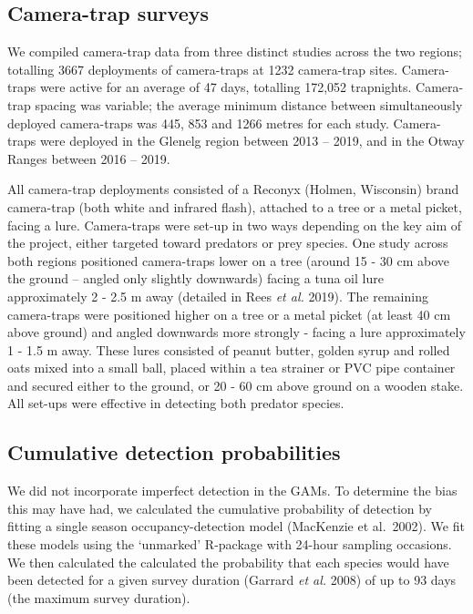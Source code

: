 \documentclass[11pt,a4paper,titlepage,twoside,openright]{style/unimelbthesis}
\begin{document}
\begin{mainmatter}
\hypertarget{camera-trap-surveys}{%
\subsection{Camera-trap surveys}\label{camera-trap-surveys}}

We compiled camera-trap data from three distinct studies across the two regions; totalling 3667 deployments of camera-traps at 1232 camera-trap sites. Camera-traps were active for an average of 47 days, totalling 172,052 trapnights. Camera-trap spacing was variable; the average minimum distance between simultaneously deployed camera-traps was 445, 853 and 1266 metres for each study. Camera-traps were deployed in the Glenelg region between 2013 -- 2019, and in the Otway Ranges between 2016 -- 2019.

All camera-trap deployments consisted of a Reconyx (Holmen, Wisconsin) brand camera-trap (both white and infrared flash), attached to a tree or a metal picket, facing a lure. Camera-traps were set-up in two ways depending on the key aim of the project, either targeted toward predators or prey species. One study across both regions positioned camera-traps lower on a tree (around 15 - 30 cm above the ground -- angled only slightly downwards) facing a tuna oil lure approximately 2 - 2.5 m away (detailed in Rees \emph{et al.} 2019). The remaining camera-traps were positioned higher on a tree or a metal picket (at least 40 cm above ground) and angled downwards more strongly - facing a lure approximately 1 - 1.5 m away. These lures consisted of peanut butter, golden syrup and rolled oats mixed into a small ball, placed within a tea strainer or PVC pipe container and secured either to the ground, or 20 - 60 cm above ground on a wooden stake. All set-ups were effective in detecting both predator species.

\hypertarget{cumulative-detection-probabilities}{%
\subsection{Cumulative detection probabilities}\label{cumulative-detection-probabilities}}

We did not incorporate imperfect detection in the GAMs. To determine the bias this may have had, we calculated the cumulative probability of detection by fitting a single season occupancy-detection model (MacKenzie et al.~2002). We fit these models using the `unmarked' R-package with 24-hour sampling occasions. We then calculated the calculated the probability that each species would have been detected for a given survey duration (Garrard \emph{et al.} 2008) of up to 93 days (the maximum survey duration).


\end{mainmatter}
\end{document}
